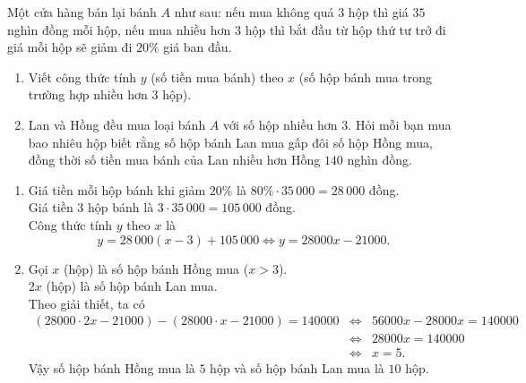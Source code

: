 \begin{bt}%
	Một cửa hàng bán lại bánh $A$ như sau: nếu mua không quá $3$ hộp thì giá $35$ nghìn đồng mỗi hộp, nếu mua nhiều hơn $3$ hộp thì bắt đầu từ hộp thứ tư trở đi giá mỗi hộp sẽ giảm đi $20\%$ giá ban đầu.
	\begin{enumerate}
		\item Viết công thức tính $y$ (số tiền mua bánh) theo $x$ (số hộp bánh mua trong trường hợp nhiều hơn $3$ hộp).
		\item Lan và Hồng đều mua loại bánh $A$ với số hộp nhiều hơn $3$. Hỏi mỗi bạn mua bao nhiêu hộp biết rằng số hộp bánh Lan mua gấp đôi số hộp Hồng mua, đồng thời số tiền mua bánh của Lan nhiều hơn Hồng $140$ nghìn đồng.
	\end{enumerate}
	\loigiai
	{
		\begin{enumerate}
			\item Giá tiền mỗi hộp bánh khi giảm $20\%$ là $80\%\cdot 35\,000=28\,000$ đồng.\\
			      Giá tiền $3$ hộp bánh là $3\cdot 35\,000=105\,000$ đồng.\\
			      Công thức tính $y$ theo $x$ là \[y=28\,000(x-3)+105\,000\Leftrightarrow y=28000x-21000.\]
			\item Gọi $x$ (hộp) là số hộp bánh Hồng mua ($x>3$).\\
			      $2x$ (hộp) là số hộp bánh Lan mua.\\
			      Theo giải thiết, ta có
			      \allowdisplaybreaks
			      \begin{eqnarray*}
				      \left(28000\cdot 2x-21000\right)-\left(28000\cdot x-21000\right)=140000&\Leftrightarrow& 56000x-28000x=140000\\&\Leftrightarrow&28000x=140000\\
				      &\Leftrightarrow&x=5.
			      \end{eqnarray*}
			      Vậy số hộp bánh Hồng mua là $5$ hộp và số hộp bánh Lan mua là $10$ hộp.
		\end{enumerate}
	}
\end{bt}

